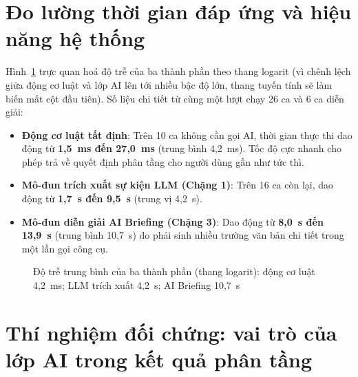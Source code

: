 \section{Đo lường thời gian đáp ứng và hiệu năng hệ thống}

Hình~\ref{fig:latency} trực quan hoá độ trễ của ba thành phần theo thang logarit
(vì chênh lệch giữa động cơ luật và lớp AI lên tới nhiều bậc độ lớn, thang tuyến
tính sẽ làm biến mất cột đầu tiên). Số liệu chi tiết từ cùng một lượt chạy
26 ca và 6 ca diễn giải:
\begin{itemize}[leftmargin=1.6em, itemsep=2pt]
  \item \textbf{Động cơ luật tất định}: Trên 10 ca không cần gọi AI, thời gian
        thực thi dao động từ \textbf{1,5~ms đến 27,0~ms} (trung bình 4,2~ms).
        Tốc độ cực nhanh cho phép trả về quyết định phân tầng cho người dùng gần
        như tức thì.
  \item \textbf{Mô-đun trích xuất sự kiện LLM (Chặng 1)}: Trên 16 ca còn lại,
        dao động từ \textbf{1,7~s đến 9,5~s} (trung vị 4,2~s).
  \item \textbf{Mô-đun diễn giải AI Briefing (Chặng 3)}: Dao động từ
        \textbf{8,0~s đến 13,9~s} (trung bình 10,7~s) do phải sinh nhiều trường
        văn bản chi tiết trong một lần gọi công cụ.
\end{itemize}

\begin{figure}[H]
\centering
{}
\caption{Độ trễ trung bình của ba thành phần (thang logarit): động cơ luật
4,2~ms; LLM trích xuất 4,2~s; AI Briefing 10,7~s}
\label{fig:latency}
\end{figure}

\section{Thí nghiệm đối chứng: vai trò của lớp AI trong kết quả phân tầng}

